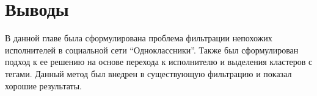 \section{Выводы}

В данной главе была сформулирована проблема фильтрации непохожих исполнителей в социальной сети ``Одноклассники''. Также был сформулирован подход к ее решению
на основе перехода к исполнителю и выделения кластеров с тегами. Данный метод был внедрен в существующую фильтрацию и показал хорошие результаты.